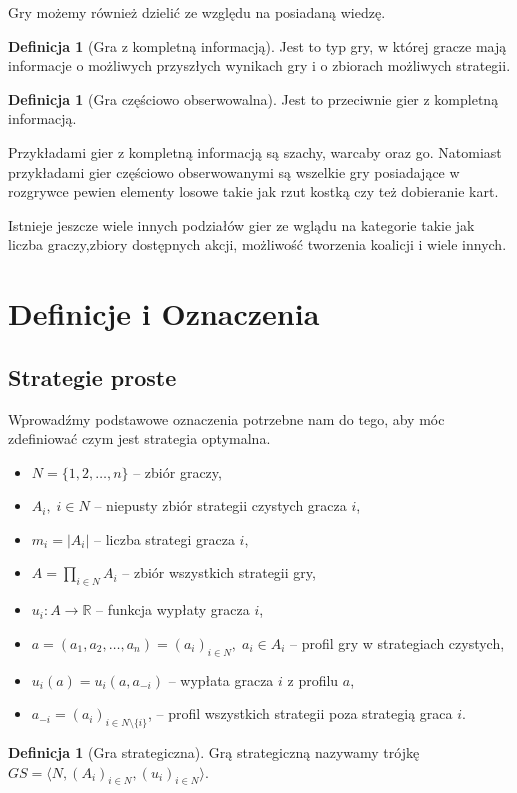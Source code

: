 \documentclass[inzynierska]{pwr_wmat_praca_dyplomowa}
\theoremstyle{plain}
\numberwithin{theorem}{chapter}
\theoremstyle{definition}
\numberwithin{theorem}{chapter}
\newtheorem{definition}[theorem]{Definicja}
\begin{document}
Gry możemy również dzielić ze względu na posiadaną wiedzę.
\begin{definition}[Gra z kompletną informacją]
	Jest to typ gry, w której gracze mają informacje o możliwych
	przyszłych wynikach gry i o zbiorach możliwych strategii.
\end{definition}
\begin{definition}[Gra częściowo obserwowalna]
	Jest to przeciwnie gier z kompletną informacją.
\end{definition}
Przykładami gier z kompletną informacją są szachy, warcaby oraz go.
Natomiast przykładami gier częściowo obserwowanymi są wszelkie gry posiadające w rozgrywce pewien elementy losowe takie jak rzut kostką czy też dobieranie kart. 

Istnieje jeszcze wiele innych podziałów gier ze wglądu na kategorie takie jak liczba graczy,zbiory dostępnych akcji, możliwość tworzenia koalicji i wiele innych.

\section{Definicje i Oznaczenia}
\subsection{Strategie proste}
Wprowadźmy podstawowe oznaczenia potrzebne nam do tego, aby móc zdefiniować czym jest strategia optymalna.
\begin{itemize}
	\item $ N = \{1,2,\dots, n\} $ -- zbiór graczy,
	\item $A_i,\; i \in N $ -- niepusty zbiór strategii  czystych gracza $i$,
	\item $m_i = |A_i|$ -- liczba strategi gracza $i$,
	\item $A = \displaystyle\prod_{i \in N} A_i$ -- zbiór wszystkich strategii gry, 
	\item $u_i : A \rightarrow \mathbb{R} $ -- funkcja wypłaty gracza $i$,
	\item $a=(a_1,a_2,\dots,a_n)=(a_i)_{i \in N},\; a_i \in A_i$ -- profil gry w strategiach czystych,
	\item $u_i(a) = u_i(a,a_{-i})$ -- wypłata gracza $i$ z profilu $a$,
	\item $a_{-i} = (a_i)_{i\in N \setminus \{i\}}$, -- profil wszystkich strategii poza strategią graca $i$.
\end{itemize}
	\begin{definition}[Gra strategiczna]
		Grą strategiczną nazywamy trójkę $GS = \langle N, (A_i)_{i \in N},(u_i)_{i \in N} \rangle $.
	\end{definition}
	
\end{document}
